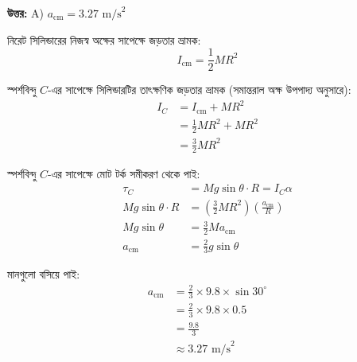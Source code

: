 \documentclass[12pt, a4paper]{article}
\begin{document}
\vspace{0.5em}
\begin{tcolorbox}[answerbox]
    \textbf{\color{success} উত্তর:} A)  $a_{\text{cm}} = 3.27\text{ m/s}^2$
\end{tcolorbox}
\vspace{1em}

\begin{tcolorbox}[solutionbox={সমাধান (Solution)}]
    \noindent
    নিরেট সিলিন্ডারের নিজস্ব অক্ষের সাপেক্ষে জড়তার ভ্রামক:
    \[ I_{\text{cm}} = \frac{1}{2} M R^2 \]
    
    স্পর্শবিন্দু $C$-এর সাপেক্ষে সিলিন্ডারটির তাৎক্ষণিক জড়তার ভ্রামক (সমান্তরাল অক্ষ উপপাদ্য অনুসারে):
    \begin{align*}
        I_C &= I_{\text{cm}} + M R^2 \\
        &= \frac{1}{2} M R^2 + M R^2 \\
        &= \frac{3}{2} M R^2
    \end{align*}
    
    স্পর্শবিন্দু $C$-এর সাপেক্ষে মোট টর্ক সমীকরণ থেকে পাই:
    \begin{align*}
        \tau_C &= M g \sin\theta \cdot R = I_C \alpha \\
        M g \sin\theta \cdot R &= \left(\frac{3}{2} M R^2\right) \left(\frac{a_{\text{cm}}}{R}\right) \\
        M g \sin\theta &= \frac{3}{2} M a_{\text{cm}} \\
        a_{\text{cm}} &= \frac{2}{3} g \sin\theta
    \end{align*}
    
    মানগুলো বসিয়ে পাই:
    \begin{align*}
        a_{\text{cm}} &= \frac{2}{3} \times 9.8 \times \sin 30^\circ \\
        &= \frac{2}{3} \times 9.8 \times 0.5 \\
        &= \frac{9.8}{3} \\
        &\approx 3.27\text{ m/s}^2
    \end{align*}
\end{tcolorbox}
\end{document}
